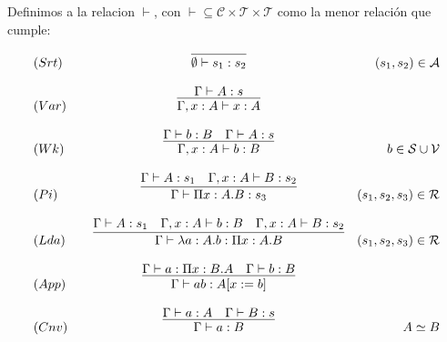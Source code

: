 \begin{definition}
Definimos a la relacion $\vdash$, con $\vdash \subseteq \mathcal{C}\times\mathcal{T}\times\mathcal{T}$ como
la menor relación que cumple:


\[
\begin{array}{llcr}
	(Srt) & &\infer{\emptyset \vdash s_{1} : s_{2}}{} & (s_{1},s_{2}) \in\mathcal{A} \\ \\
	(Var) & &\infer{\Gamma, x:A \vdash x:A}{\Gamma\vdash A:s} & \\ \\
	(Wk)  & &\infer{\Gamma, x:A \vdash b:B}{\Gamma\vdash b:B & \Gamma\vdash A:s} & b\in\mathcal{S}\cup\mathcal{V} \\ \\
	(Pi)  & &\infer{\Gamma \vdash \Pi x:A.B : s_{3}}{\Gamma\vdash A:s_{1} & \Gamma, x:A \vdash B:s_{2}} &  (s_1,s_2,s_3)\in\mathcal{R}\\ \\
	(Lda) & &\infer{\Gamma \vdash \lambda a:A.b : \Pi x:A.B }{\Gamma\vdash A:s_{1} & \Gamma, x:A \vdash b:B &\Gamma, x:A \vdash B:s_{2}} &  (s_1,s_2,s_3)\in\mathcal{R}\\ \\
	(App) & &\infer{\Gamma \vdash a b : A[x:= b] }{\Gamma\vdash a : \Pi x:B.A & \Gamma \vdash b:B} &  \\ \\
	(Cnv) & &\infer{\Gamma \vdash a:B}{\Gamma\vdash a:A & \Gamma\vdash B:s} & A \simeq B \\ \\
	
\end{array}
\]

\end{definition}

